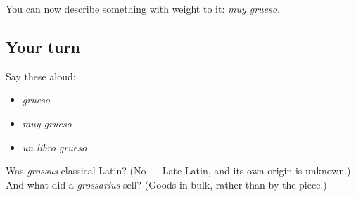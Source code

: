 \begin{grammarlens}[title={What you've built}]
You can now describe something with weight to it: \emph{muy grueso}.
\end{grammarlens}

\subsection*{Your turn}
Say these aloud:

\begin{itemize}
\raggedright
  \item \emph{grueso}
  \item \emph{muy grueso}
  \item \emph{un libro grueso}
\end{itemize}

\begin{tcolorbox}[breakable,colback=teal!4,colframe=teal!35!black,title={Before you move on}]
Was \emph{grossus} classical Latin? (No — Late Latin, and its own origin is unknown.) And what did a \emph{grossarius} sell? (Goods in bulk, rather than by the piece.)
\end{tcolorbox}
